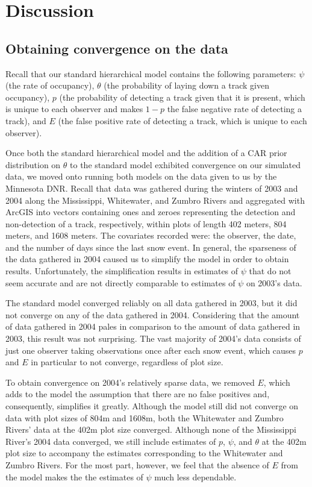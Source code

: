 \documentclass[12pt]{article}
\begin{document}
\section{Discussion}

    \subsection{Obtaining convergence on the data}
    Recall that our standard hierarchical model contains the following
    parameters: \(\psi\) (the rate of occupancy), \(\theta\) (the probability of
    laying down a track given occupancy), \(p\) (the probability of detecting a
    track given that it is present, which is unique to each observer and makes
    \(1-p\) the false negative rate of detecting a track), and \(E\) (the false
    positive rate of detecting a track, which is unique to each observer).

    Once both the standard hierarchical model and the addition of a CAR prior
    distribution on \(\theta\) to the standard model exhibited convergence on
    our simulated data, we moved onto running both models on the data given to
    us by the Minnesota DNR. Recall that data was gathered during the winters of
    2003 and 2004 along the Mississippi, Whitewater, and Zumbro Rivers and
    aggregated with ArcGIS into vectors containing ones and zeroes representing
    the detection and non-detection of a track, respectively, within plots of
    length 402 meters, 804 meters, and 1608 meters. The covariates recorded
    were: the observer, the date, and the number of days since the last snow
    event. In general, the sparseness of the data gathered in 2004 caused us to
    simplify the model in order to obtain results. Unfortunately, the
    simplification results in estimates of \(\psi\) that do not seem accurate
    and are not directly comparable to estimates of \(\psi\) on 2003's data.

    The standard model converged reliably on all data gathered in 2003, but it
    did not converge on any of the data gathered in 2004. Considering that the
    amount of data gathered in 2004 pales in comparison to the amount of data
    gathered in 2003, this result was not surprising. The vast majority of
    2004's data consists of just one observer taking observations once after
    each snow event, which causes \(p\) and \(E\) in particular to not converge,
    regardless of plot size.

    To obtain convergence on 2004's relatively sparse data, we removed \(E\),
    which adds to the model the assumption that there are no false positives
    and, consequently, simplifies it greatly. Although the model still did not
    converge on data with plot sizes of 804m and 1608m, both the Whitewater and
    Zumbro Rivers' data at the 402m plot size converged. Although none of the
    Mississippi River's 2004 data converged, we still include estimates of
    \(p\), \(\psi\), and \(\theta\) at the 402m plot size to accompany the
    estimates corresponding to the Whitewater and Zumbro Rivers. For the most
    part, however, we feel that the absence of \(E\) from the model makes the
    the estimates of \(\psi\) much less dependable.
\end{document}
